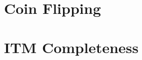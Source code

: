 \documentclass[conference]{IEEEtran}
\begin{document}
\section{Coin Flipping} \label{app:flip}


\section{ITM Completeness} \label{app:itm}


%

%

%

\pagebreak

%

%

%
%
%
%
%
%
%
%
%
\end{document}
